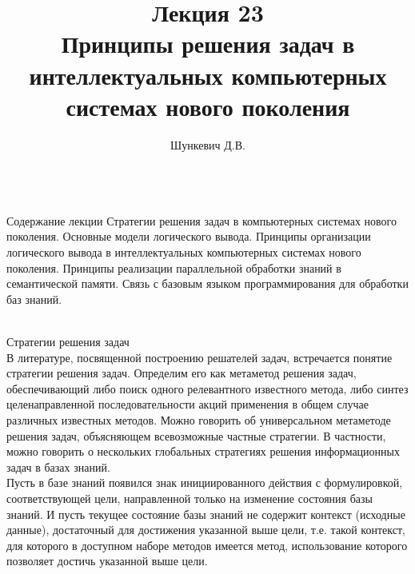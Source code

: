 \title{Лекция 23\\Принципы решения задач в интеллектуальных компьютерных системах нового поколения}
\author[]{Шункевич Д.В.}

\begin{frame}
	\titlepage
\end{frame}

\begin{frame}{\\Содержание лекции}
	\topline
	\justifying
	Стратегии решения задач в компьютерных системах нового поколения. Основные модели логического вывода. Принципы организации логического вывода в интеллектуальных компьютерных системах нового поколения. Принципы реализации параллельной обработки знаний в семантической памяти. Связь с базовым языком программирования для обработки баз знаний. 
\end{frame}

\begin{frame}{\\Стратегии решения задач}
\topline
\vspace{30pt}
 \\
 
    В литературе, посвященной построению решателей задач, встречается понятие стратегии решения задач. Определим его как метаметод решения задач, обеспечивающий либо поиск одного релевантного известного метода, либо синтез целенаправленной последовательности акций применения в общем случае различных известных методов. Можно говорить об универсальном метаметоде решения задач, объясняющем всевозможные частные стратегии. В частности, можно говорить о нескольких глобальных стратегиях решения информационных задач в базах знаний.\\
    Пусть в базе знаний появился знак инициированного действия с формулировкой, соответствующей цели, направленной только на изменение состояния базы знаний. И пусть текущее состояние базы знаний не содержит контекст (исходные данные), достаточный для достижения указанной выше цели, т.е. такой контекст, для которого в доступном наборе методов имеется метод, использование которого позволяет достичь указанной выше цели.
\end{frame}

